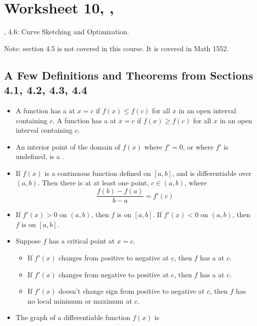 \newpage\section*{Worksheet 10, \Course, \Semester} 
\noindent {}, 4.6: Curve Sketching and Optimization. 

Note: section 4.5 is not covered in this course. It is covered in Math 1552.

\subsection*{A Few Definitions and Theorems from Sections 4.1, 4.2, 4.3, 4.4}

	\begin{itemize}
    	\item {} A function has a  at $x = c$ if $f(x) \le f(c)$ for all $x$ in an open interval containing $c$. A function has a  at $x = c$ if $f(x) \ge f(c)$ for all $x$ in an open interval containing $c$. 
        \item {} An interior point of the domain of $f(x)$ where $f'=0$, or where $f'$ is undefined, is a . 
        \item {} If $f(x)$ is a continuous function defined on $[a,b]$, and is differentiable over $(a,b)$. Then there is at at least one point, $c \in (a,b)$, where 
        $$\frac{f(b)-f(a)}{b-a} = f'(c)$$ 
        \item {} If $f'(x) > 0$ on $(a,b)$, then $f$ is  on $[a,b]$. If $f'(x) < 0$ on $(a,b)$, then $f$ is  on $[a,b]$.
        \item {} Suppose $f$ has a critical point at $x=c$.
        \begin{itemize}
            \item If $f'(x)$ changes from positive to negative at $c$, then $f$ has a  at $c$.
            \item If $f'(x)$ changes from negative to positive at $c$, then $f$ has a  at $c$.
            \item If $f'(x)$ doesn't change sign from positive to negative at $c$, then $f$ has no local minimum or maximum at $c$.
        \end{itemize}
        \item The graph of a differentiable function $f(x)$ is 
        \begin{itemize}

\end{itemize}
\end{itemize}
